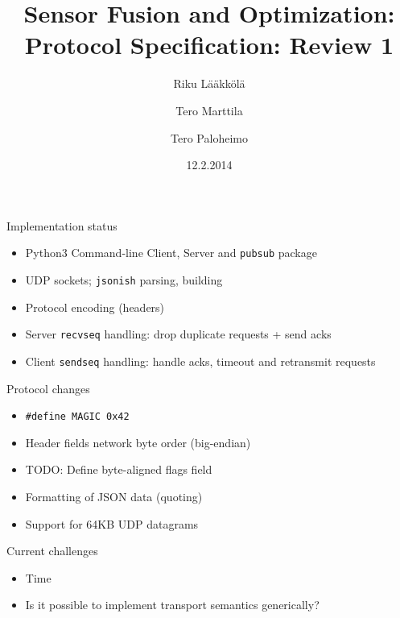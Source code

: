 \documentclass{beamer}
\title[SFO protocol]{Sensor Fusion and Optimization: Protocol Specification: Review 1}
\author{Riku Lääkkölä \and Tero Marttila \and Tero Paloheimo}
\institute{Aalto ELEC}
\date{12.2.2014}
\begin{document}
\begin{frame}
  \titlepage
\end{frame}

\begin{frame}{Implementation status}
\begin{itemize}
    \item Python3 Command-line Client, Server and \texttt{pubsub} package
    \item UDP sockets; \texttt{jsonish} parsing, building
    \item Protocol encoding (headers)
    \item Server \texttt{recvseq} handling: drop duplicate requests + send acks
    \item Client \texttt{sendseq} handling: handle acks, timeout and retransmit requests
\end{itemize}
\end{frame}

\begin{frame}{Protocol changes}
\begin{itemize}
    \item \texttt{\#define MAGIC 0x42}
    \item Header fields network byte order (big-endian)
  	\item TODO: Define byte-aligned flags field
    \item Formatting of JSON data (quoting)
    \item Support for 64KB UDP datagrams
\end{itemize}
\end{frame}

\begin{frame}{Current challenges}
\begin{itemize}
	\item Time
	\item Is it possible to implement transport semantics generically?
\end{itemize}
\end{frame}
\end{document}
